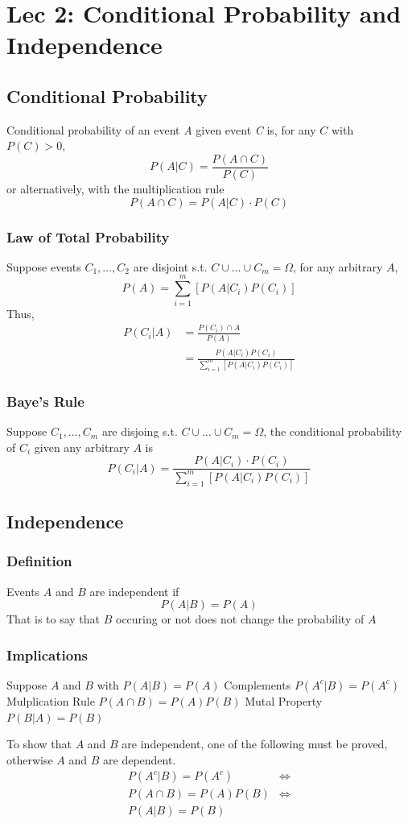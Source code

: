 \documentclass{article}
\begin{document}
\section{Lec 2: Conditional Probability and Independence}
\subsection{Conditional Probability}
Conditional probability of an event \emph{A} given event \emph{C} is, for any $C$ with $P(C) > 0$,
$$P(A|C) = \frac{P(A\cap C)}{P(C)}$$
or alternatively, with the multiplication rule
$$P(A\cap C) = P(A|C) \cdot P(C)$$
\subsubsection{Law of Total Probability}
Suppose events $C_1, \dots, C_2$ are disjoint s.t. $C\cup \dots \cup C_m = \Omega$, for any arbitrary $A$,
$$P(A) = \sum^m_{i=1}[P(A|C_i)P(C_i)]$$
Thus,
\begin{align*}
P(C_i|A) &= \frac{P(C_i)\cap A}{P(A)}\\
&= \frac{P(A|C_i)P(C_i)}{\sum^m_{i=1}[P(A|C_i) P(C_i)]}
\end{align*}
\subsubsection{Baye's Rule}
Suppose $C_1, \dots, C_m$ are disjoing s.t. $C\cup \dots \cup C_m = \Omega$, the conditional probability of $C_i$ given any arbitrary $A$ is
$$P(C_i|A)=\frac{P(A|C_i)\cdot P(C_i)}{\sum^m_{i=1}[P(A|C_i)P(C_i)]}$$
\newpage
\subsection{Independence}
\subsubsection{Definition}
\begin{definition}
Events $A$ and $B$ are independent if
$$P(A|B) = P(A)$$
That is to say that $B$ occuring or not does not change the probability of $A$
\end{definition}
\hbox{}
\subsubsection{Implications}
\begin{outline}[enumerate]
\1 Suppose $A$ and $B$ with $P(A|B) = P(A)$
\2 Complements
\3 $P(A^c|B) = P(A^c)$
\2 Mulplication Rule
\3 $P(A\cap B) = P(A)P(B)$
\2 Mutal Property
\3 $P(B|A) = P(B)$
\end{outline}
To show that $A$ and $B$ are independent, one of the following must be proved, otherwise $A$ and $B$ are dependent.
\begin{align*}
P(A^c|B) = P(A^c) &\iff\\
P(A\cap B) = P(A)P(B) &\iff\\
P(A|B) = P(B)&
\end{align*}
\newpage
\end{document}
